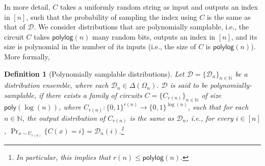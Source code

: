 \documentclass[10pt,a4paper]{article}
\newtheorem{definition}{Definition}[section]
\newcommand{\poly}{\mathsf{poly}}
\newcommand{\polylog}{\mathsf{polylog}}
\newcommand{\N}{\mathbb{N}}
\newcommand{\sD}{\mathcal{D}}
\begin{document}
In more detail, $C$ takes a uniformly random string as input and outputs an index in $[n]$, such that the probability of sampling the index using $C$ is the same as that of $\sD$. We consider distributions that are polynomially samplable, i.e., the circuit $C$ takes $\polylog(n)$ many random bits, outputs an index in $[n]$, and its size is polynomial in the number of its inputs (i.e., the size of $C$ is $\polylog(n)$). More formally,
\begin{definition}[Polynomially samplable distributions]
\label{def:psamp}
Let $\sD = \{\sD_n\}_{n \in \N}$ be a distribution ensemble, where each $\sD_n \in \Delta \left( \Omega_n\right)$. $\sD$ is said to be polynomially-samplable, if there exists a family of circuits $C = \{C_{r(n)}\}_{n \in \N}$ of size $\poly(\log (n))$, where $C_{r(n)} : \{0,1\}^{r(n)} \rightarrow \{0,1\}^{\log (n)}$, such that for each $n \in \N$, the output distribution of $C_{r(n)}$ is the same as $\sD_n$, i.e., for every $i \in [n]$, $\Pr_{x \sim U_{r(n)}} \{ C(x) = i\} = \sD_n(i)$.\footnote{In particular, this implies that $r(n) \leq \polylog(n)$.} 
\end{definition}
\end{document}
